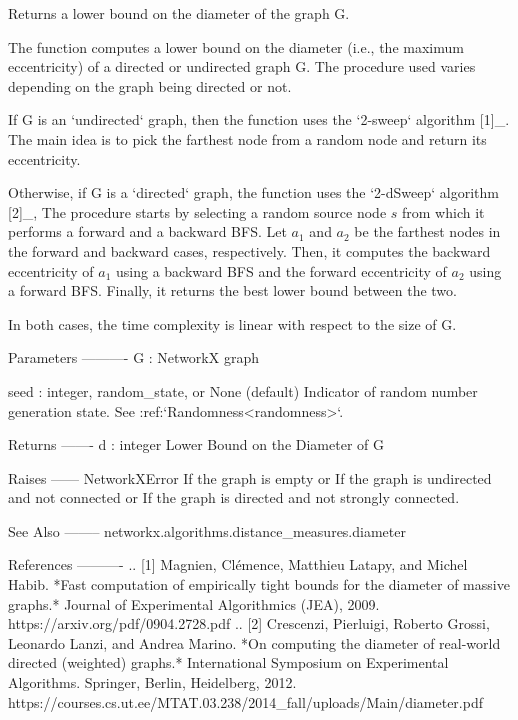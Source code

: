 \begin{DoxyVerb}Returns a lower bound on the diameter of the graph G.

The function computes a lower bound on the diameter (i.e., the maximum eccentricity)
of a directed or undirected graph G. The procedure used varies depending on the graph
being directed or not.

If G is an `undirected` graph, then the function uses the `2-sweep` algorithm [1]_.
The main idea is to pick the farthest node from a random node and return its eccentricity.

Otherwise, if G is a `directed` graph, the function uses the `2-dSweep` algorithm [2]_,
The procedure starts by selecting a random source node $s$ from which it performs a
forward and a backward BFS. Let $a_1$ and $a_2$ be the farthest nodes in the forward and
backward cases, respectively. Then, it computes the backward eccentricity of $a_1$ using
a backward BFS and the forward eccentricity of $a_2$ using a forward BFS.
Finally, it returns the best lower bound between the two.

In both cases, the time complexity is linear with respect to the size of G.

Parameters
----------
G : NetworkX graph

seed : integer, random_state, or None (default)
    Indicator of random number generation state.
    See :ref:`Randomness<randomness>`.

Returns
-------
d : integer
   Lower Bound on the Diameter of G

Raises
------
NetworkXError
    If the graph is empty or
    If the graph is undirected and not connected or
    If the graph is directed and not strongly connected.

See Also
--------
networkx.algorithms.distance_measures.diameter

References
----------
.. [1] Magnien, Clémence, Matthieu Latapy, and Michel Habib.
   *Fast computation of empirically tight bounds for the diameter of massive graphs.*
   Journal of Experimental Algorithmics (JEA), 2009.
   https://arxiv.org/pdf/0904.2728.pdf
.. [2] Crescenzi, Pierluigi, Roberto Grossi, Leonardo Lanzi, and Andrea Marino.
   *On computing the diameter of real-world directed (weighted) graphs.*
   International Symposium on Experimental Algorithms. Springer, Berlin, Heidelberg, 2012.
   https://courses.cs.ut.ee/MTAT.03.238/2014_fall/uploads/Main/diameter.pdf
\end{DoxyVerb}
 